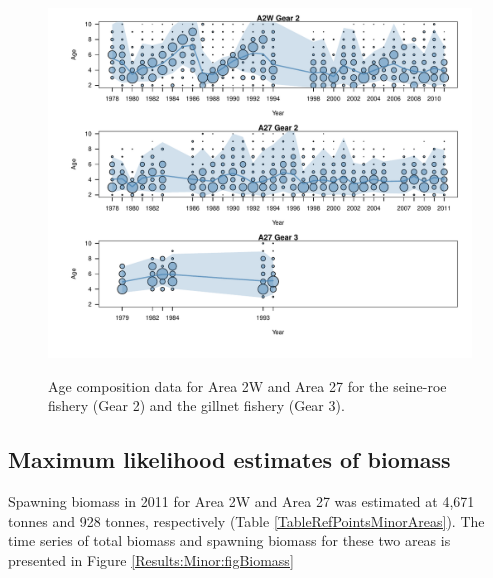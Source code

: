 \begin{figure}[!tbp]
	\includegraphics[width=\textwidth]{../FIGS/MinorAreas/iscam_fig_AgeCompsMinor.pdf}\\
	\caption{Age composition data for Area 2W and Area 27 for the seine-roe fishery (Gear 2) and the gillnet fishery (Gear 3).}\label{Results:Minor:figAgeComps}
\end{figure}


\subsection{Maximum likelihood estimates of biomass}

Spawning biomass in 2011 for Area 2W and Area 27 was estimated at 4,671 tonnes and 928 tonnes, respectively (Table \ref{TableRefPointsMinorAreas}).  The time series of total biomass and spawning biomass for these two areas is presented in Figure \ref{Results:Minor:figBiomass}





